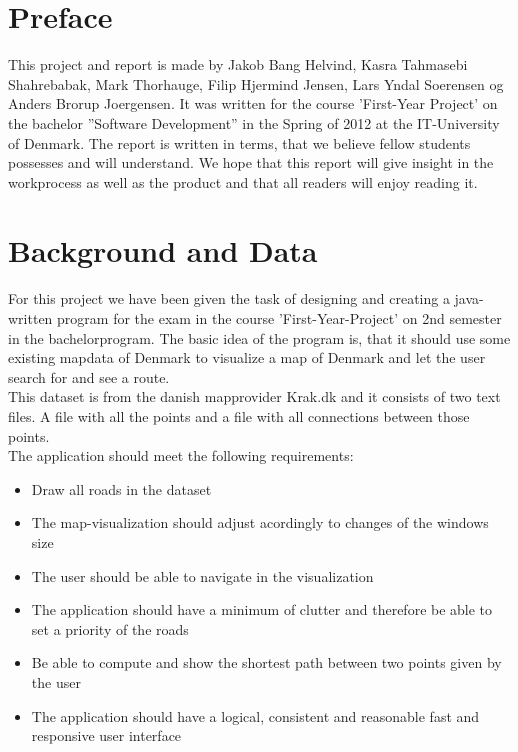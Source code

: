 \documentclass[a4paper,10pt,titlepage]{article}
\begin{document}
	\tableofcontents
	
	\newpage
	\section{Preface}
		This project and report is made by Jakob Bang Helvind, Kasra Tahmasebi Shahrebabak, Mark Thorhauge, Filip Hjermind Jensen, Lars Yndal Soerensen og
		Anders Brorup Joergensen. It was written for the course ’First-Year Project’ on the bachelor ”Software Development” in the Spring of 2012 at the
		IT-University of Denmark. The report is written in terms, that we believe fellow students possesses and will understand. We hope that this 
		report will give insight in the workprocess as well as the product and that all readers will enjoy reading it.
		
	\newpage
	\section{Background and Data}
	
		For this project we have been given the task of designing and creating a java-written program 
		for the exam in the course 'First-Year-Project' on 2nd semester in the bachelorprogram. The basic idea of the 
		program is, that it should use some existing mapdata of Denmark to visualize a map of Denmark and let the user search for and see a route. 
		\\This dataset is from the danish mapprovider Krak.dk and it consists of two text files. A file with all the points 
		and a file with all connections between those points.  
		\\The application should meet the following requirements:
		\begin{itemize}
		\item Draw all roads in the dataset
		\item The map-visualization should adjust acordingly to changes of the windows size
		\item The user should be able to navigate in the visualization
		\item The application should have a minimum of clutter and therefore be able to set a priority of the roads
		\item Be able to compute and show the shortest path between two points given by the user
		\item The application should have a logical, consistent and reasonable fast and responsive user interface\\
		\end{itemize}
		
\end{document}
